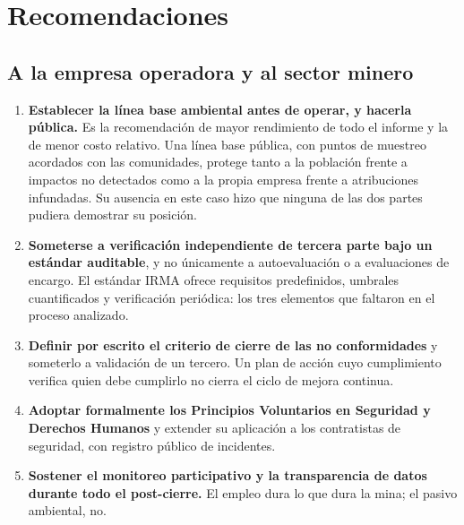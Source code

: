%

\section{Recomendaciones}
\label{sec:recomendaciones}

\subsection{A la empresa operadora y al sector minero}

\begin{enumerate}
  \item \textbf{Establecer la línea base ambiental antes de operar, y hacerla
        pública.} Es la recomendación de mayor rendimiento de todo el informe y
        la de menor costo relativo. Una línea base pública, con puntos de muestreo
        acordados con las comunidades, protege tanto a la población frente a
        impactos no detectados como a la propia empresa frente a atribuciones
        infundadas. Su ausencia en este caso hizo que ninguna de las dos partes
        pudiera demostrar su posición.
  \item \textbf{Someterse a verificación independiente de tercera parte bajo un
        estándar auditable}, y no únicamente a autoevaluación o a evaluaciones de
        encargo. El estándar IRMA ofrece requisitos predefinidos, umbrales
        cuantificados y verificación periódica: los tres elementos que faltaron en
        el proceso analizado.
  \item \textbf{Definir por escrito el criterio de cierre de las no
        conformidades} y someterlo a validación de un tercero. Un plan de acción
        cuyo cumplimiento verifica quien debe cumplirlo no cierra el ciclo de
        mejora continua.
  \item \textbf{Adoptar formalmente los Principios Voluntarios en Seguridad y
        Derechos Humanos} y extender su aplicación a los contratistas de
        seguridad, con registro público de incidentes.
  \item \textbf{Sostener el monitoreo participativo y la transparencia de datos
        durante todo el post-cierre.} El empleo dura lo que dura la mina; el
        pasivo ambiental, no.
\end{enumerate}

